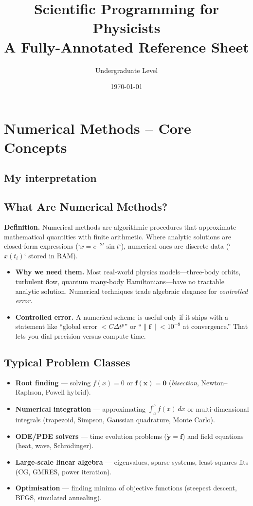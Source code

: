 \documentclass[a4paper,11pt]{article}
\title{\textbf{Scientific Programming for Physicists}\\
       \large A Fully-Annotated Reference Sheet}
\author{Undergraduate Level}
\date{\today}
\begin{document}
\maketitle
\tableofcontents
\bigskip
\newpage

\section{Numerical Methods – Core Concepts}

\subsection{My interpretation}

\subsection{What Are Numerical Methods?}
\textbf{Definition.} Numerical methods are algorithmic procedures that approximate mathematical quantities with finite arithmetic.  
Where analytic solutions are closed-form expressions (`$x=e^{-2t}\sin t$`), numerical ones are discrete data (`$x(t_i)$` stored in RAM).

\begin{itemize}
  \item \textbf{Why we need them.} Most real-world physics models—three-body orbits, turbulent flow, quantum many-body Hamiltonians—have no tractable analytic solution. Numerical techniques trade algebraic elegance for \emph{controlled error}.
  \item \textbf{Controlled error.} A numerical scheme is useful only if it ships with a statement like “global error $< C\Delta t^{p}$” or “$\|\mathbf f\|<10^{-9}$ at convergence.”  That lets you dial precision versus compute time.
\end{itemize}

\subsection{Typical Problem Classes}

\begin{itemize}
  \item \textbf{Root finding} — solving $f(x)=0$ or $\mathbf f(\mathbf x)=\mathbf0$ (\emph{bisection}, Newton–Raphson, Powell hybrid).
  \item \textbf{Numerical integration} — approximating $\int_a^b f(x)\,dx$ or multi-dimensional integrals (trapezoid, Simpson, Gaussian quadrature, Monte Carlo).
  \item \textbf{ODE/PDE solvers} — time evolution problems ($\dot{\mathbf y}=\mathbf f$) and field equations (heat, wave, Schrödinger).
  \item \textbf{Large-scale linear algebra} — eigenvalues, sparse systems, least-squares fits (CG, GMRES, power iteration).
  \item \textbf{Optimisation} — finding minima of objective functions (steepest descent, BFGS, simulated annealing).
\end{itemize}
\end{document}

